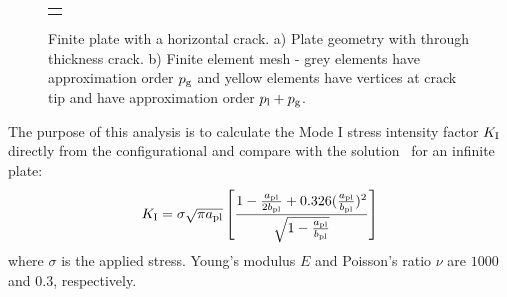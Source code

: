 \documentclass[onecolumn]{svjour3}
\begin{document}
\begin{figure}[h!]
\begin{center}
\begin{tabular}{c}
{\def\svgwidth{8cm} }\\
\end{tabular}
\caption{Finite plate with a horizontal crack. a) Plate geometry with through thickness crack. b) Finite element mesh - grey elements have approximation order $p_{\rm g}$ and yellow elements have vertices at crack tip and have approximation order $p_{\rm l}+p_{\rm g}$. }
\label{fig:plate_load_mesh}
\end{center}
\end{figure}

The purpose of this analysis is to calculate the Mode I stress intensity factor $ K_{\rm I} $ directly from the configurational and compare with the solution~\cite{rooke1976compendium} for an infinite plate:
\begin{equation}\label{eq:frac_analytical}
K_{\rm I}=\sigma \sqrt{\pi a_{\rm {pl}}} \left[  \frac{1 - \frac{a_{\rm {pl}}}{2b_{\rm {pl}}} + 0.326 (\frac{a_{\rm {pl}}}{b_{\rm {pl}}})^2 }{\sqrt{1-\frac{a_{\rm {pl}}}{b_{\rm {pl}}}}}  \right]
\end{equation}
where $\sigma $ is the applied stress. 
Young's modulus $E$ and Poisson's ratio $\nu$ are $1000$ and $0.3$, respectively. 
\end{document}
